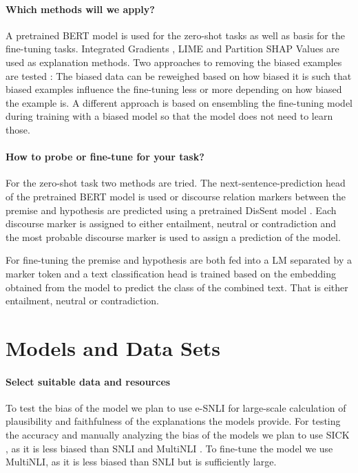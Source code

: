 \documentclass[12pt,a4paper]{article}
\begin{document}
\paragraph{Which methods will we apply?} A pretrained BERT model \parencite{devlin2018bert} is used for the zero-shot tasks as well as basis for the fine-tuning tasks. Integrated Gradients \parencite{sundararajan2017integratedgradients}, LIME \parencite{ribeiro2016lime} and Partition SHAP Values \parencite{lundberg2017shap} are used as explanation methods. Two approaches to removing the biased examples are tested \parencite{clark2019don}: The biased data can be reweighed based on how biased it is such that biased examples influence the fine-tuning less or more depending on how biased the example is. A different approach is based on ensembling the fine-tuning model during training with a biased model so that the model does not need to learn those.

\paragraph{How to probe or fine-tune for your task?} For the zero-shot task two methods are tried. The next-sentence-prediction head of the pretrained BERT model is used or discourse relation markers between the premise and hypothesis are predicted using a pretrained DisSent model \parencite{nie2017dissent}. Each discourse marker is assigned to either entailment, neutral or contradiction and the most probable discourse marker is used to assign a prediction of the model.

For fine-tuning the premise and hypothesis are both fed into a \ac{LM} separated by a marker token and a text classification head is trained based on the embedding obtained from the model to predict the class of the combined text. That is either entailment, neutral or contradiction.

\section{Models and Data Sets}
\paragraph{Select suitable data and resources}
To test the bias of the model we plan to use e-SNLI \parencite{camburu2018esnli} for large-scale calculation of plausibility and faithfulness of the explanations the models provide. For testing the accuracy and manually analyzing the bias of the models we plan to use SICK \parencite{marelli2014sick}, as it is less biased than SNLI \parencite{bowman2015snli} and MultiNLI \parencite{williams2018multinli}. To fine-tune the model we use MultiNLI, as it is less biased than SNLI but is sufficiently large.
\end{document}
